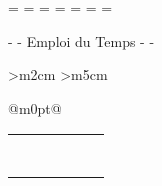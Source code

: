 
\ifpdf
{}
\fi



\pagestyle{fancy}


\paperwidth=\pdfpageheight
\paperheight=\pdfpagewidth
\pdfpageheight=\paperheight
\pdfpagewidth=\paperwidth
\headwidth=\textheight
\begingroup 
\vsize=\textwidth
\hsize=\textheight

\begin{center}
  {\large \institution{} - \dpt{} - Emploi du Temps - \semestre{} -
    \anneescolaire{}}
\end{center}
\begin{center}
  {\LARGE \bf \fulltitle{}}
\end{center}
  
\newcolumntype{D} { >{\centering\arraybackslash}m{2cm}}
\newcolumntype{H} { >{\vspace{-4ex}\centering\arraybackslash}m{5cm}}

\newcolumntype{X} {@{}m{0pt}@{}} %

\begin{center}
  \begin{tabular}{|D||H|H||H|H|X}\hline
    \rule{0pt}{0.8cm}             & \hourone{}     & \hourtwo{}     & \hourthree{}     & \hourfour{}     &\tabularnewline      \hline
    \rule{0pt}{1.8cm} \lundi{}    & \lundione{}    & \lunditwo{}    & \lundithree{}    & \lundifour{}    &\tabularnewline      \hline
    \rule{0pt}{1.8cm} \mardi{}    & \mardione{}    & \marditwo{}    & \mardithree{}    & \mardifour{}    &\tabularnewline      \hline
    \rule{0pt}{1.8cm} \mercredi{} & \mercredione{} & \mercreditwo{} & \mercredithree{} & \mercredifour{} &\tabularnewline      \hline
    \rule{0pt}{1.8cm} \jeudi{}    & \jeudione{}    & \jeuditwo{}    & \jeudithree{}    & \jeudifour{}    &\tabularnewline      \hline
    \rule{0pt}{1.8cm} \vendredi{} & \vendredione{} & \vendreditwo{} & \vendredithree{} & \vendredifour{} &\tabularnewline      \hline
    \rule{0pt}{1.8cm} \samedi{}   & \samedione{}   & \sameditwo{}   & \samedithree{}   & \samedifour{}   &\tabularnewline [1cm]\hline
	                                                     &\tabularnewline      \hline
  \end{tabular}
\end{center}

